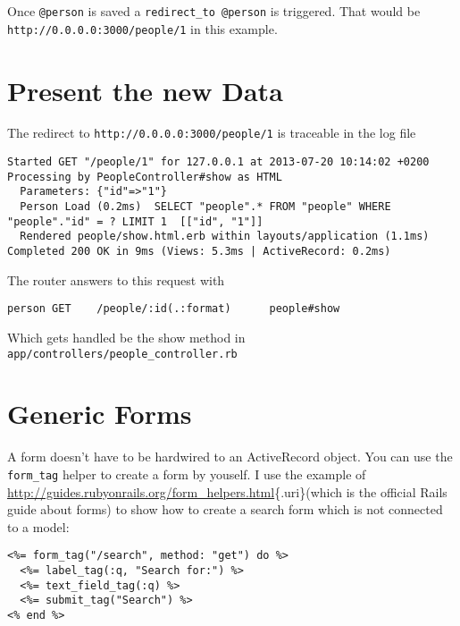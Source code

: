\documentclass[a4paper]{book}
\begin{document}
Once \texttt{@person} is saved a \texttt{redirect\_to       @person} is triggered. That would be \texttt{http://0.0.0.0:3000/people/1} in this example.

\section{Present the new Data}\label{present-the-new-data}

The redirect to \texttt{http://0.0.0.0:3000/people/1} is traceable in the log file

\begin{shaded}\begin{verbatim}
Started GET "/people/1" for 127.0.0.1 at 2013-07-20 10:14:02 +0200
Processing by PeopleController#show as HTML
  Parameters: {"id"=>"1"}
  Person Load (0.2ms)  SELECT "people".* FROM "people" WHERE "people"."id" = ? LIMIT 1  [["id", "1"]]
  Rendered people/show.html.erb within layouts/application (1.1ms)
Completed 200 OK in 9ms (Views: 5.3ms | ActiveRecord: 0.2ms)
\end{verbatim}\end{shaded}

The router answers to this request with

\begin{shaded}\begin{verbatim}
person GET    /people/:id(.:format)      people#show
\end{verbatim}\end{shaded}

Which gets handled be the show method in \texttt{app/controllers/people\_controller.rb}

\section{Generic Forms}\label{generic-forms}

A form doesn't have to be hardwired to an ActiveRecord object. You can use the \texttt{form\_tag} helper to create a form by youself. I use the example of \url{http://guides.rubyonrails.org/form_helpers.html}\{.uri\}(which is the official Rails guide about forms) to show how to create a search form which is not connected to a model:

\begin{shaded}\begin{verbatim}
<%= form_tag("/search", method: "get") do %>
  <%= label_tag(:q, "Search for:") %>
  <%= text_field_tag(:q) %>
  <%= submit_tag("Search") %>
<% end %>
\end{verbatim}\end{shaded}
\end{document}
